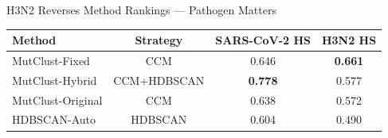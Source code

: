 \documentclass[aspectratio=169,11pt]{beamer}
\begin{document}
\begin{frame}{H3N2 Reverses Method Rankings --- Pathogen Matters}

\begin{center}
\begin{tabular}{lccc}
\toprule
\textbf{Method} & \textbf{Strategy} & \textbf{SARS-CoV-2 HS} & \textbf{H3N2 HS} \\
\midrule
MutClust-Fixed & CCM & 0.646 & \textbf{0.661} \\
\rowcolor{stage1blue!8}
MutClust-Hybrid & CCM+HDBSCAN & \textbf{0.778} & 0.577 \\
MutClust-Original & CCM & 0.638 & 0.572 \\
HDBSCAN-Auto & HDBSCAN & 0.604 & 0.490 \\
\bottomrule
\end{tabular}
\end{center}

\vspace{1em}
\begin{center}
\end{center}
\end{frame}
\end{document}
